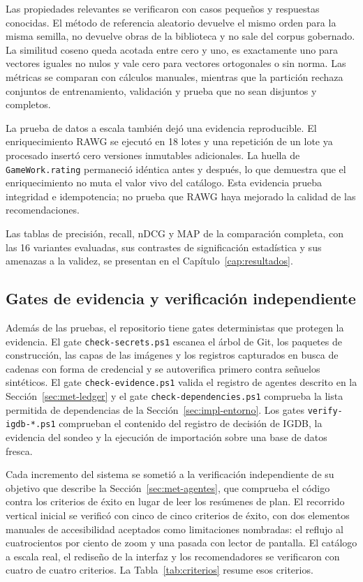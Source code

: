 Las propiedades relevantes se verificaron con casos pequeños y respuestas conocidas. El
método de referencia aleatorio devuelve el mismo orden para la misma semilla, no devuelve obras de la
biblioteca y no sale del corpus gobernado. La similitud coseno queda acotada entre cero y
uno, es exactamente uno para vectores iguales no nulos y vale cero para vectores ortogonales
o sin norma. Las métricas se comparan con cálculos manuales, mientras que la partición rechaza
conjuntos de entrenamiento, validación y prueba que no sean disjuntos y completos.

La prueba de datos a escala también dejó una evidencia reproducible. El enriquecimiento RAWG
se ejecutó en 18 lotes y una repetición de un lote ya procesado insertó cero versiones inmutables
adicionales. La huella de \texttt{GameWork.rating} permaneció idéntica antes y después, lo
que demuestra que el enriquecimiento no muta el valor vivo del catálogo. Esta evidencia
prueba integridad e idempotencia; no prueba que RAWG haya mejorado la calidad de las
recomendaciones.

Las tablas de precisión, recall, nDCG y MAP de la comparación completa, con las 16 variantes evaluadas, sus contrastes de significación estadística y sus amenazas a la validez, se presentan en el Capítulo~\ref{cap:resultados}.

\subsection{Gates de evidencia y verificación independiente}\label{sec:pru-gates}\label{sec:pru-verificacion-fase}

Además de las pruebas, el repositorio tiene gates deterministas que protegen la evidencia. El
gate \texttt{check-secrets.ps1} escanea el árbol de Git, los paquetes de construcción, las
capas de las imágenes y los registros capturados en busca de cadenas con forma de credencial
y se autoverifica primero contra señuelos sintéticos. El gate \texttt{check-evidence.ps1}
valida el registro de agentes descrito en la Sección~\ref{sec:met-ledger} y el gate
\texttt{check-dependencies.ps1} comprueba la lista permitida de dependencias de la
Sección~\ref{sec:impl-entorno}. Los gates \texttt{verify-igdb-*.ps1} comprueban el contenido del
registro de decisión de IGDB, la evidencia del sondeo y la ejecución de importación sobre una
base de datos fresca.

Cada incremento del sistema se sometió a la verificación independiente de su objetivo que
describe la Sección~\ref{sec:met-agentes}, que comprueba el código contra los criterios de
éxito en lugar de leer los resúmenes de plan. El recorrido vertical
inicial se verificó con cinco de cinco criterios de éxito, con dos elementos manuales de
accesibilidad aceptados como limitaciones nombradas: el reflujo al cuatrocientos por ciento
de zoom y una pasada con lector de pantalla. El catálogo a escala real, el rediseño de la
interfaz y los recomendadores se verificaron con cuatro de cuatro criterios. La Tabla~\ref{tab:criterios} resume esos criterios.

